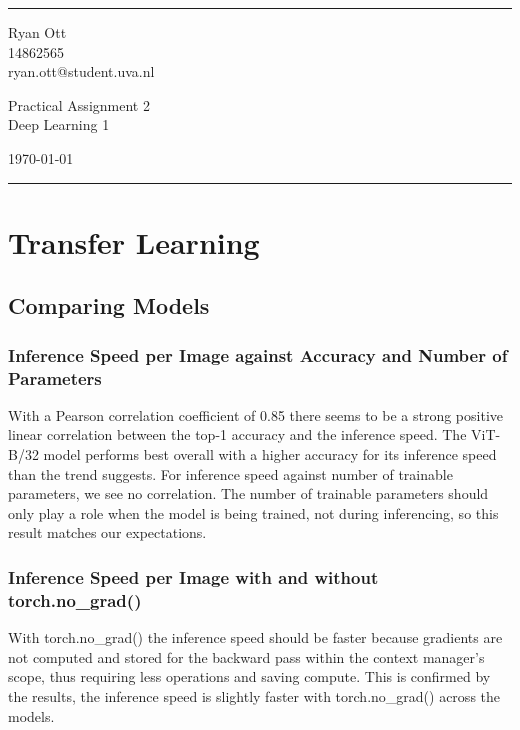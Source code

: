 \documentclass[a4paper]{article}
\begin{document}

\fancyhead[C]{}
\hrule \medskip %
\begin{minipage}{0.295\textwidth} 
\raggedright
\footnotesize
Ryan Ott \hfill\\   
14862565 \hfill\\
ryan.ott@student.uva.nl
\end{minipage}
\begin{minipage}{0.4\textwidth} 
\centering 
\large 
Practical Assignment 2\\ 
\normalsize 
Deep Learning 1\\ 
\end{minipage}
\begin{minipage}{0.295\textwidth} 
\raggedleft
\today\hfill\\
\end{minipage}
\medskip\hrule 
\bigskip


\section{Transfer Learning}
\subsection{Comparing Models}
\subsubsection{Inference Speed per Image against Accuracy and Number of Parameters}
With a Pearson correlation coefficient of 0.85 there seems to be a strong positive linear correlation between the
top-1 accuracy and the inference speed. The ViT-B/32 model performs best overall with a higher accuracy for its
inference speed than the trend suggests.
For inference speed against number of trainable parameters, we see no correlation. The number of trainable parameters
should only play a role when the model is being trained, not during inferencing, so this result matches our
expectations.

\subsubsection{Inference Speed per Image with and without torch.no\_grad()}
With torch.no\_grad() the inference speed should be faster because gradients are not computed and stored for the
backward pass within the context manager's scope, thus requiring less operations and saving compute. This is
confirmed by the results, the inference speed is slightly faster with torch.no\_grad() across the models.
\end{document}
